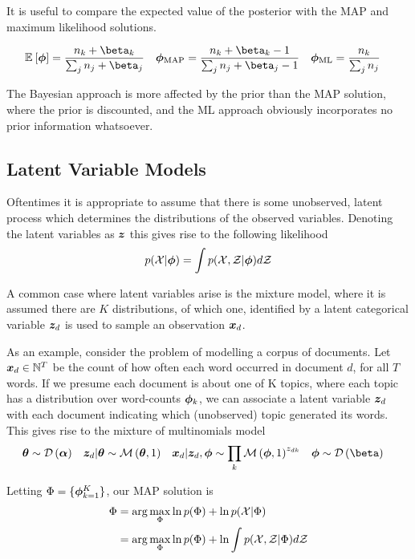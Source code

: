 It is useful to compare the expected value of the posterior with the MAP and maximum likelihood solutions.

\begin{align}
\ex{\param}{}  &= \frac{n_k + \beta_k}{\sum_j n_j + \beta_j} &
\map{\param} &= \frac{n_k + \beta_k - 1}{\sum_j n_j + \beta_j - 1} &
\ml{\param}  &= \frac{n_k}{\sum_j n_j}
\end{align}

The Bayesian approach is more affected by the prior than the MAP solution, where the prior is discounted, and the ML approach obviously incorporates no prior information whatsoever.
 
\subsection{Latent Variable Models}
Oftentimes it is appropriate to assume that there is some unobserved, latent process which determines the distributions of the observed variables. Denoting the latent variables as $\bm z$ this gives rise to the following likelihood
\begin{align}
p({ \mathcal{X} }|{ \bm \phi }) = \int p({ \mathcal{X} }, { \mathcal{Z} }|{ \bm \phi }) d{ \mathcal{Z} }
\end{align}

A common case where latent variables arise is the mixture model, where it is assumed there are $K$ distributions, of which one, identified by a latent categorical variable $\bm z_d$ is used to sample an observation ${ \bm x_d }$. 

As an example, consider the problem of modelling a corpus of documents. Let ${ \bm x_d } \in \mathbb{N}^T$ be the count of how often each word occurred in document $d$, for all $T$ words. If we presume each document is about one of K topics, where each topic has a distribution over word-counts $\bm \phi_k$, we can associate a latent variable $\bm z_d$ with each document indicating which (unobserved) topic generated its words. This gives rise to the mixture of multinomials model\cite{Nigam2000}
\begin{align}
\vv{\theta} & \sim \dir{\vv{\alpha}} &
\vv{z}_d|\vv{\theta} & \sim \muln{\vv{\theta}}{1} & 
\vv{x}_d|\vv{z}_d, \param & \sim \prod_k \muln{\param}{1}^{z_{dk}} & 
\param & \sim \dir{\vv{\beta}}
\end{align}

Letting ${ \Phi } = \{ \bm \phi_{k=1}^K \}$, our MAP solution is
\begin{align}
\begin{split}
{ \Phi } 
    &= \arg \max_{ \Phi } \ln p({ \Phi }) + \ln p({ \mathcal{X} }|{ \Phi }) \\
    &= \arg \max_{ \Phi } \ln p({ \Phi }) + \ln \int { p( { \mathcal{X} } ,  { \mathcal{Z} } |  { \Phi } ) } d{ \mathcal{Z} }
\end{split}
\end{align}



